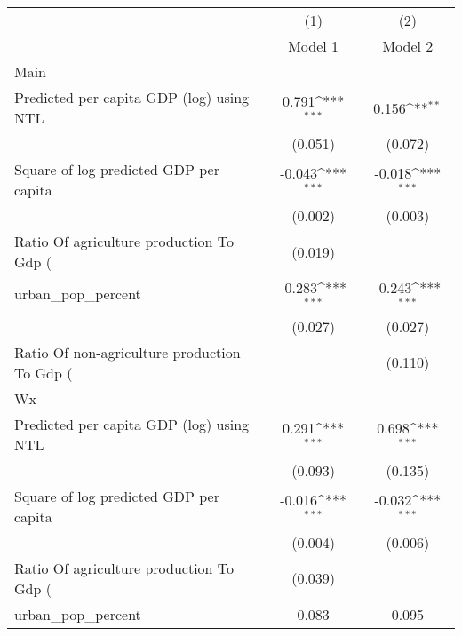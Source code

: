 {
\def\sym#1{\ifmmode^{#1}\else\(^{#1}\)\fi}
\begin{tabular}{l*{2}{c}}
\hline\hline
                    &\multicolumn{1}{c}{(1)}&\multicolumn{1}{c}{(2)}\\
                    &\multicolumn{1}{c}{Model 1}&\multicolumn{1}{c}{Model 2}\\
\hline
Main                &                     &                     \\
Predicted per capita GDP (log) using NTL&       0.791\sym{***}&       0.156\sym{**} \\
                    &     (0.051)         &     (0.072)         \\
[1em]
Square of log predicted GDP per capita&      -0.043\sym{***}&      -0.018\sym{***}\\
                    &     (0.002)         &     (0.003)         \\
[1em]
Ratio Of agriculture production To Gdp (%
                    &     (0.019)         &                     \\
[1em]
urban\_pop\_percent   &      -0.283\sym{***}&      -0.243\sym{***}\\
                    &     (0.027)         &     (0.027)         \\
[1em]
Ratio Of non-agriculture production To Gdp (%
                    &                     &     (0.110)         \\
\hline
Wx                  &                     &                     \\
Predicted per capita GDP (log) using NTL&       0.291\sym{***}&       0.698\sym{***}\\
                    &     (0.093)         &     (0.135)         \\
[1em]
Square of log predicted GDP per capita&      -0.016\sym{***}&      -0.032\sym{***}\\
                    &     (0.004)         &     (0.006)         \\
[1em]
Ratio Of agriculture production To Gdp (%
                    &     (0.039)         &                     \\
[1em]
urban\_pop\_percent   &       0.083         &       0.095         \\

\end{tabular}}
